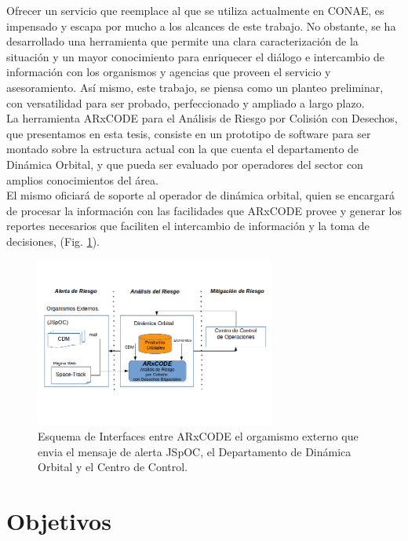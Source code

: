 Ofrecer un servicio que reemplace al que se utiliza actualmente en CONAE, es impensado y escapa por mucho a los alcances de este trabajo. No obstante, se ha desarrollado una herramienta que permite una clara caracterizaci\'on de la situaci\'on y un mayor conocimiento para enriquecer el di\'alogo e intercambio de informaci\'on con los organismos y agencias que proveen el servicio y asesoramiento. As\'i mismo, este trabajo,  se piensa como un planteo preliminar, con versatilidad para ser probado, perfeccionado y ampliado a largo plazo.\\

La herramienta ARxCODE para el An\'alisis de Riesgo por Colisi\'on con Desechos, que presentamos en esta tesis, consiste en un prototipo de software para ser montado sobre la estructura actual con la que cuenta el departamento de Din\'amica Orbital, y que pueda ser evaluado por operadores del sector con amplios conocimientos del \'area.\\

El mismo oficiar\'a de soporte al operador de din\'amica orbital, quien se encargar\'a de procesar la informaci\'on con las facilidades que ARxCODE provee y generar los reportes necesarios que faciliten el intercambio de informaci\'on y la toma de decisiones, (Fig. \ref{fig:arcodeInterface}). \\ 


\begin{figure}[!h]
\centering
  \includegraphics[width=0.7\textwidth]{imagenes/interfasessistemas}
  \caption[Interfaces del ARxCODE]{Esquema de Interfaces entre ARxCODE el orgamismo externo que envia el mensaje de alerta JSpOC, el Departamento de Din\'amica Orbital y el Centro de Control.}
  \label{fig:arcodeInterface}
\end{figure}



\section{Objetivos}

